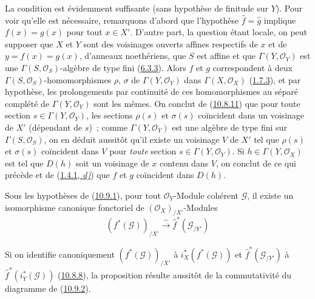La condition est évidemment suffisante (sans hypothèse de finitude sur
$Y$). Pour voir qu'elle est nécessaire, remarquons d'abord que l'hypothèse
$\widehat f=\widehat g$ implique $f(x)=g(x)$ pour tout $x\in X'$. D'autre
part, la question étant locale, on peut supposer que $X$ et $Y$ sont des
voisinages ouverts affines respectifs de $x$ et de $y=f(x)=g(x)$,
d'anneaux noethériens, que $S$ est affine et que
$\Gamma(Y,\mathscr{O}_Y)$ est une $\Gamma(S,\mathscr{O}_S)$-algèbre de
type fini (\hyperref[I.6.3.3-fr]{6.3.3}). Alors $f$ et $g$ correspondent à
deux $\Gamma(S,\mathscr{O}_S)$-homomorphismes $\rho$, $\sigma$ de
$\Gamma(Y,\mathscr{O}_Y)$ dans $\Gamma(X,\mathscr{O}_X)$
(\hyperref[I.1.7.3-fr]{1.7.3}), et par hypothèse, les prolongements par
continuité de ces homomorphismes au séparé complété de
$\Gamma(Y,\mathscr{O}_Y)$ sont les mêmes. On conclut de
(\hyperref[I.10.8.11-fr]{10.8.11}) que pour toute section
$s\in\Gamma(Y,\mathscr{O}_Y)$, les sections $\rho(s)$ et $\sigma(s)$
coïncident dans un voisinage de $X'$ (dépendant de $s$)~; comme
$\Gamma(Y,\mathscr{O}_Y)$ est une algèbre de type fini sur
$\Gamma(S,\mathscr{O}_S)$, on en déduit aussitôt qu'il existe un
voisinage $V$ de $X'$ tel que $\rho(s)$ et $\sigma(s)$ coïncident dans
$V$ pour \emph{toute} section $s\in\Gamma(Y,\mathscr{O}_Y)$. Si
$h\in\Gamma(Y,\mathscr{O}_X)$ est tel que $D(h)$ soit un voisinage de $x$
contenu dans $V$, on conclut de ce qui précède et de
(\hyperref[I.1.4.1-fr]{1.4.1, \emph{d)}}) que $f$ et $g$ coïncident dans $D(h)$.

\begin{proposition}[10.9.5]
\label{I.10.9.5-fr}
Sous les hypothèses de \textup{(\hyperref[I.10.9.1-fr]{10.9.1})}, pour tout
$\mathscr{O}_Y$-Module cohérent $\mathscr{G}$, il existe un isomorphisme
canonique fonctoriel de $(\mathscr{O}_X)_{/X'}$-Modules
\[
  (f^*(\mathscr{G}))_{/X'}\xrightarrow{\sim}
  \widehat f^*(\mathscr{G}_{/Y'})
\]
\end{proposition}

Si on identifie canoniquement $(f^*(\mathscr{G}))_{/X'}$ à
$i_X^*(f^*(\mathscr{G}))$ et $\widehat f^*(\mathscr{G}_{/Y'})$ à
$\widehat f^*(i_Y^*(\mathscr{G}))$
(\hyperref[I.10.8.8-fr]{10.8.8}), la proposition résulte aussitôt de la
commutativité du diagramme de
(\hyperref[I.10.9.2-fr]{10.9.2}).

